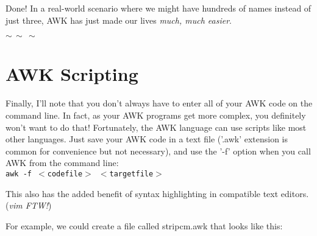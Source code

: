\documentclass[10pt,a4]{article}
\begin{document}
\ttfamily
\colorbox{black}{}
\normalfont

Done! In a real-world scenario where we might have hundreds of names instead of just three, AWK has just made our lives \emph{much, much easier}.


\large
$\sim \, \sim \, \sim$
\normalsize



\pagebreak



\section*{AWK Scripting}

Finally, I'll note that you don't always have to enter all of your AWK code on the command line. In fact, as your AWK programs get more complex, you definitely won't want to do that! Fortunately, the AWK language can use scripts like most other languages. Just save your AWK code in a text file ('.awk' extension is common for convenience but not necessary), and use the '-f' option when you call AWK from the command line:\\
\texttt{awk -f $<$codefile$>$ $<$targetfile$>$}

This also has the added benefit of syntax highlighting in compatible text editors. (\emph{vim FTW!})

For example, we could create a file called stripcm.awk that looks like this:

\ttfamily
\colorbox{black}{}
\normalfont
\end{document}
